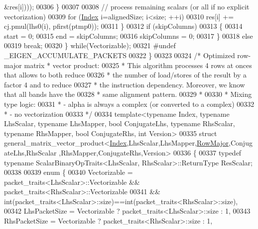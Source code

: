 \begin{DoxyCode}
{      &res[i])));
00306       \}
00307 
00308       \textcolor{comment}{// process remaining scalars (or all if no explicit vectorization)}
00309       \textcolor{keywordflow}{for} (\hyperlink{namespace_eigen_a62e77e0933482dafde8fe197d9a2cfde}{Index} i=alignedSize; i<size; ++i)
00310         res[i] += cj.pmul(lhs0(i), pfirst(ptmp0));
00311     \}
00312     \textcolor{keywordflow}{if} (skipColumns)
00313     \{
00314       start = 0;
00315       end = skipColumns;
00316       skipColumns = 0;
00317     \}
00318     \textcolor{keywordflow}{else}
00319       \textcolor{keywordflow}{break};
00320   \} \textcolor{keywordflow}{while}(Vectorizable);
00321 \textcolor{preprocessor}{  #undef \_EIGEN\_ACCUMULATE\_PACKETS}
00322 \}
00323 
00324 \textcolor{comment}{/* Optimized row-major matrix * vector product:}
00325 \textcolor{comment}{ * This algorithm processes 4 rows at onces that allows to both reduce}
00326 \textcolor{comment}{ * the number of load/stores of the result by a factor 4 and to reduce}
00327 \textcolor{comment}{ * the instruction dependency. Moreover, we know that all bands have the}
00328 \textcolor{comment}{ * same alignment pattern.}
00329 \textcolor{comment}{ *}
00330 \textcolor{comment}{ * Mixing type logic:}
00331 \textcolor{comment}{ *  - alpha is always a complex (or converted to a complex)}
00332 \textcolor{comment}{ *  - no vectorization}
00333 \textcolor{comment}{ */}
00334 \textcolor{keyword}{template}<\textcolor{keyword}{typename} Index, \textcolor{keyword}{typename} LhsScalar, \textcolor{keyword}{typename} LhsMapper, \textcolor{keywordtype}{bool} ConjugateLhs, \textcolor{keyword}{typename} RhsScalar, \textcolor{keyword}{
      typename} RhsMapper, \textcolor{keywordtype}{bool} ConjugateRhs, \textcolor{keywordtype}{int} Version>
00335 \textcolor{keyword}{struct }general\_matrix\_vector\_product<\hyperlink{namespace_eigen_a62e77e0933482dafde8fe197d9a2cfde}{Index},LhsScalar,LhsMapper,\hyperlink{group__enums_ggaacded1a18ae58b0f554751f6cdf9eb13acfcde9cd8677c5f7caf6bd603666aae3}{RowMajor},ConjugateLhs,RhsScalar
      ,RhsMapper,ConjugateRhs,Version>
00336 \{
00337 \textcolor{keyword}{typedef} \textcolor{keyword}{typename} ScalarBinaryOpTraits<LhsScalar, RhsScalar>::ReturnType ResScalar;
00338 
00339 \textcolor{keyword}{enum} \{
00340   Vectorizable = packet\_traits<LhsScalar>::Vectorizable && packet\_traits<RhsScalar>::Vectorizable
00341               && int(packet\_traits<LhsScalar>::size)==int(packet\_traits<RhsScalar>::size),
00342   LhsPacketSize = Vectorizable ? packet\_traits<LhsScalar>::size : 1,
00343   RhsPacketSize = Vectorizable ? packet\_traits<RhsScalar>::size : 1,
}
\end{DoxyCode}
